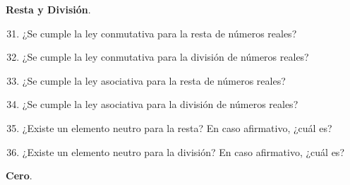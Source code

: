 \documentclass[10pt,a4paper]{article}
\begin{document}
\begin{flushleft}
{\bfseries Resta y División}.
\end{flushleft}
\begin{enumerate}[label=\textbf{\arabic*.}]
\setcounter{enumi}{30}
\item ¿Se cumple la ley conmutativa para la resta de números reales?
\item ¿Se cumple la ley conmutativa para la división de números reales?
\item ¿Se cumple la ley asociativa para la resta de números reales?
\item ¿Se cumple la ley asociativa para la división de números reales?
\item ¿Existe un elemento neutro para la resta? En caso afirmativo, ¿cuál es?
\item ¿Existe un elemento neutro para la división? En caso afirmativo, ¿cuál es?
\end{enumerate}
{\bfseries Cero}.
\end{document}
